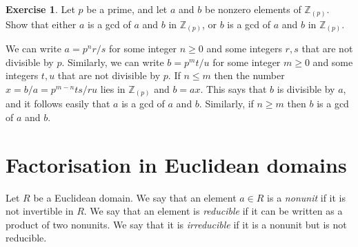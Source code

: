 \documentclass{amsart}
\newcommand{\Z}         {{\mathbb{Z}}}
\newcommand{\ip}[1]     {\langle #1\rangle}
\renewcommand{\:}{\colon}
\theoremstyle{definition}
\newtheorem{exercise}{Exercise}[section]
\renewenvironment{solution}{\SolutionAtEnd}{\endSolutionAtEnd}
\begin{document}
\begin{exercise}
 Let $p$ be a prime, and let $a$ and $b$ be nonzero elements of
 $\Z_{(p)}$.  Show that either $a$ is a gcd of $a$ and $b$ in
 $\Z_{(p)}$, or $b$ is a gcd of $a$ and $b$ in $\Z_{(p)}$.
\end{exercise}
\begin{solution}
 We can write $a=p^nr/s$ for some integer $n\geq 0$ and some integers
 $r,s$ that are not divisible by $p$.  Similarly, we can write
 $b=p^mt/u$ for some integer $m\geq 0$ and some integers
 $t,u$ that are not divisible by $p$.  If $n\leq m$ then the number
 $x=b/a=p^{m-n}ts/ru$ lies in $\Z_{(p)}$ and $b=ax$.  This says that
 $b$ is divisible by $a$, and it follows easily that $a$ is a gcd of
 $a$ and $b$.  Similarly, if $n\geq m$ then $b$ is a gcd of $a$ and
 $b$. 
\end{solution}


\section{Factorisation in Euclidean domains}
\label{sec-factorisation}

Let $R$ be a Euclidean domain.  We say that an element $a\in R$ is a
\emph{nonunit} if it is not invertible in $R$.  We say that an element
is \emph{reducible} if it can be written as a product of two nonunits.
We say that it is \emph{irreducible} if it is a nonunit but is not
reducible. 
\end{document}
